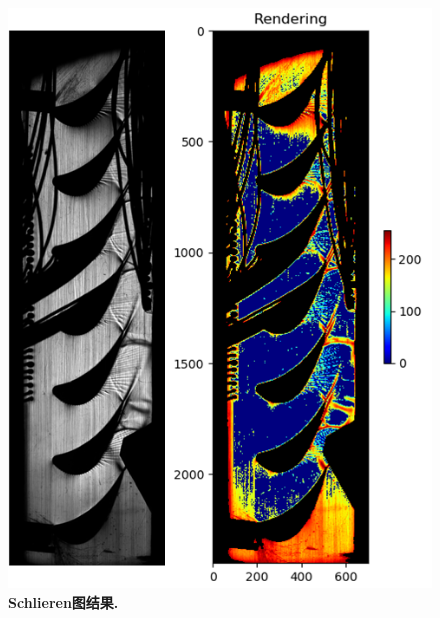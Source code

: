 \begin{figure}[t]
	\begin{center}
		\includegraphics[width=0.75\linewidth]{src/first_show}
	\end{center}
	\caption{ \textbf{Schlieren图结果.}}
	\label{fig:first_show}	
\end{figure}